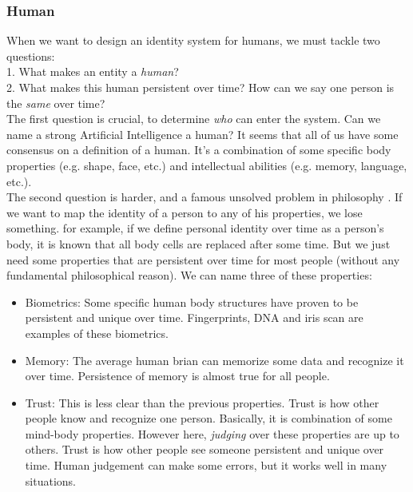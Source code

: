 \documentclass[conference]{IEEEtran}
\begin{document}
\subsubsection{Human}
When we want to design an identity system for humans, we must tackle two questions:
\\
1. What makes an entity a \textit{human}?
\\
2. What makes this human persistent over time? How can we say one person is the \textit{same} over time?
\\
The first question is crucial, to determine \textit{who} can enter the system. Can we name a strong Artificial Intelligence a human? It seems that all of us have some consensus on a definition of a human. It's a combination of some specific body properties (e.g. shape, face, etc.) and intellectual abilities (e.g. memory, language, etc.). 
\\
The second question is harder, and a famous unsolved problem in philosophy \cite{identity-personal}. If we want to map the identity of a person to any of his properties, we lose something. for example, if we define personal identity over time as a person's body, it is known that all body cells are replaced after some time. But we just need some properties that are persistent over time for most people (without any fundamental philosophical reason). We can name three of these properties: 
\begin{itemize}
\item{Biometrics:}
Some specific human body structures have proven to be persistent and unique over time. Fingerprints, DNA and iris scan are examples of these biometrics.
\item{Memory:}
The average human brian can memorize some data and recognize it over time. Persistence of memory is almost true for all people.
\item{Trust:}
This is less clear than the previous properties. Trust is how other people know and recognize one person. Basically, it is combination of some mind-body properties. However here, \textit{judging} over these properties are up to others. Trust is how other people see someone persistent and unique over time. Human judgement can make some errors, but it works well in many situations.
\end{itemize}
\end{document}
